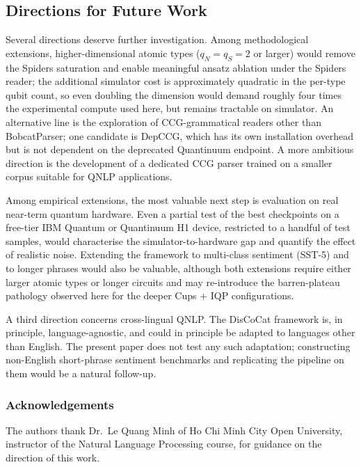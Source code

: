 \documentclass[11pt, a4paper]{article}
\begin{document}
\subsection{Directions for Future Work}

Several directions deserve further investigation. Among methodological extensions, higher-dimensional
atomic types (\(q_N = q_S = 2\) or larger) would remove the Spiders
saturation and enable meaningful ansatz ablation under the Spiders
reader; the additional simulator cost is approximately quadratic in
the per-type qubit count, so even doubling the dimension would
demand roughly four times the experimental compute used here, but
remains tractable on simulator. An alternative line is the
exploration of CCG-grammatical readers other than BobcatParser; one
candidate is DepCCG, which has its own installation overhead but is
not dependent on the deprecated Quantinuum endpoint. A more
ambitious direction is the development of a dedicated CCG parser
trained on a smaller corpus suitable for QNLP applications.

Among empirical extensions, the most valuable next step is
evaluation on real near-term quantum hardware. Even a partial test
of the best checkpoints on a free-tier IBM Quantum or Quantinuum H1
device, restricted to a handful of test samples, would characterise
the simulator-to-hardware gap and quantify the effect of realistic
noise. Extending the framework to multi-class sentiment (SST-5) and
to longer phrases would also be valuable, although both extensions
require either larger atomic types or longer circuits and may
re-introduce the barren-plateau pathology observed here for the
deeper Cups + IQP configurations.

A third direction concerns cross-lingual QNLP. The DisCoCat
framework is, in principle, language-agnostic, and could in
principle be adapted to languages other than English. The present
paper does not test any such adaptation; constructing
non-English short-phrase sentiment benchmarks and replicating the
pipeline on them would be a natural follow-up.

\subsubsection*{Acknowledgements}

The authors thank Dr.\ Le Quang Minh of Ho Chi Minh City Open
University, instructor of the Natural Language Processing course,
for guidance on the direction of this work.
\end{document}
